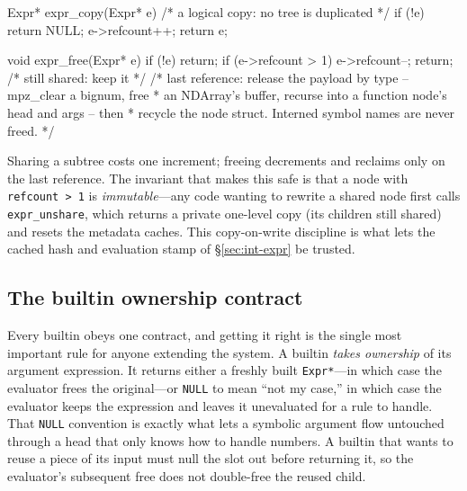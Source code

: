 \begin{ccode}
Expr* expr_copy(Expr* e) {          /* a logical copy: no tree is duplicated */
    if (!e) return NULL;
    e->refcount++;
    return e;
}

void expr_free(Expr* e) {
    if (!e) return;
    if (e->refcount > 1) { e->refcount--; return; }  /* still shared: keep it */
    /* last reference: release the payload by type -- mpz_clear a bignum, free
     * an NDArray's buffer, recurse into a function node's head and args -- then
     * recycle the node struct. Interned symbol names are never freed. */
}
\end{ccode}

Sharing a subtree costs one increment; freeing decrements and reclaims only on the
last reference. The invariant that makes this safe is that a node with
\texttt{refcount > 1} is \emph{immutable}---any code wanting to rewrite a shared node
first calls \texttt{expr\_unshare}, which returns a private one-level copy (its
children still shared) and resets the metadata caches. This copy-on-write discipline
is what lets the cached hash and evaluation stamp of \S\ref{sec:int-expr} be trusted.

\subsection*{The builtin ownership contract}

Every builtin obeys one contract, and getting it right is the single most important
rule for anyone extending the system. A builtin \emph{takes ownership} of its argument
expression. It returns either a freshly built \texttt{Expr*}---in which case the
evaluator frees the original---or \texttt{NULL} to mean ``not my case,'' in which case
the evaluator keeps the expression and leaves it unevaluated for a rule to handle. That
\texttt{NULL} convention is exactly what lets a symbolic argument flow untouched
through a head that only knows how to handle numbers. A builtin that wants to reuse a
piece of its input must null the slot out before returning it, so the evaluator's
subsequent free does not double-free the reused child.

